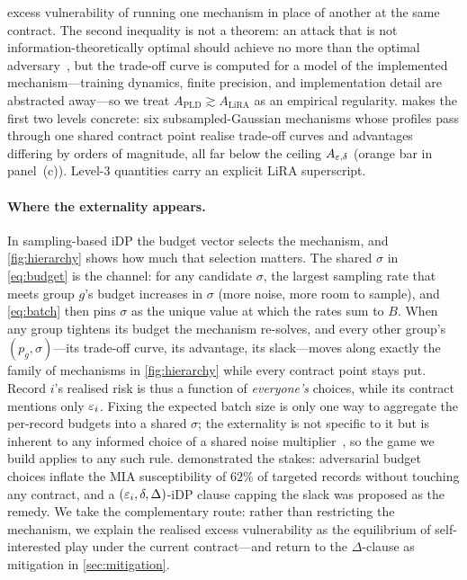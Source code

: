 excess vulnerability of running one mechanism in place of another at
the same contract. The second inequality is not a theorem: an attack
that is not information-theoretically optimal should achieve no more
than the optimal adversary~\cite{kaissis2023optimal}, but the
trade-off curve is computed for a model of the implemented
mechanism---training dynamics, finite precision, and implementation
detail are abstracted away---so we treat $A_{\mathrm{PLD}} \gtrsim
A_{\mathrm{LiRA}}$ as an empirical regularity.
 makes the first two levels
concrete: six subsampled-Gaussian mechanisms whose profiles pass
through one shared contract point realise trade-off curves and
advantages differing by orders of magnitude, all far below the
ceiling $A_{\varepsilon,\delta}$ (orange bar in panel~(c)). Level-3
quantities carry an explicit $\mathrm{LiRA}$ superscript.



\paragraph{Where the externality appears.} In sampling-based iDP the
budget vector selects the mechanism, and \cref{fig:hierarchy} shows
how much that selection matters. The shared $\sigma$ in \eqref{eq:budget} is
the channel: for any candidate $\sigma$, the largest sampling rate
that meets group $g$'s budget increases in $\sigma$ (more noise,
more room to sample), and \eqref{eq:batch} then pins $\sigma$ as the unique
value at which the rates sum to $B$. When any group tightens its
budget the mechanism re-solves, and every other group's $(p_g,
\sigma)$---its trade-off curve, its advantage, its slack---moves
along exactly the family of mechanisms in \cref{fig:hierarchy} while
every contract point stays put. Record $i$'s realised risk is thus a
function of \emph{everyone's} choices, while its contract mentions
only $\varepsilon_i$. Fixing the expected batch size is only one way to
aggregate the per-record budgets into a shared $\sigma$; the
externality is not specific to it but is inherent to any informed
choice of a shared noise multiplier~\cite{kaiser2026your}, so the
game we build applies to any such rule. \citet{kaiser2026your}
demonstrated the stakes: adversarial budget choices inflate the \ac{MIA}
susceptibility of $62\%$ of targeted records without touching any
contract, and a $(\varepsilon_i, \delta, \Delta)$-iDP clause capping the
slack was proposed as the remedy. We take the complementary route:
rather than restricting the mechanism, we explain the realised excess
vulnerability as the equilibrium of self-interested play under the
current contract---and return to the $\Delta$-clause as mitigation in
\cref{sec:mitigation}.

